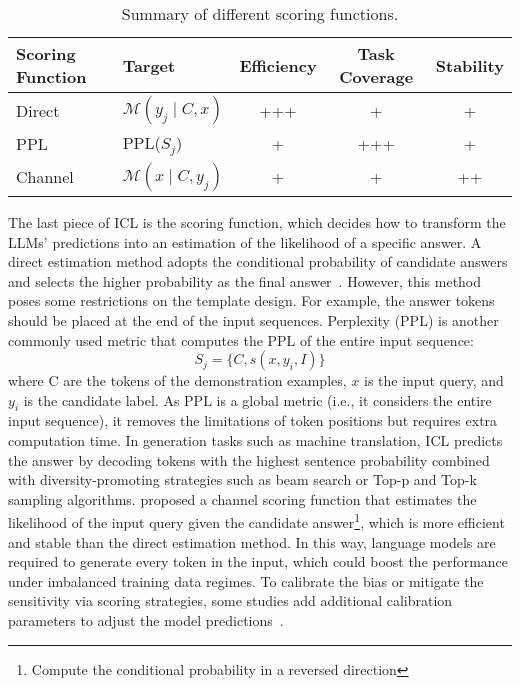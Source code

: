 \begin{table}[h!]
	\centering
	\small
	\begin{tabularx}{0.8\textwidth}{lXccc}
		\toprule
		\textbf{Scoring Function} & \textbf{Target}              & \textbf{Efficiency} & \textbf{Task Coverage} & \textbf{Stability} \\
		\midrule
		Direct                    & $\mathcal{M}(y_j \mid C, x)$ & +++                 & +                      & +                  \\
		PPL                       & PPL($S_j$)                   & +                   & +++                    & +                  \\
		Channel                   & $\mathcal{M}(x \mid C, y_j)$ & +                   & +                      & ++                 \\
		\bottomrule
	\end{tabularx}
	\caption{Summary of different scoring functions.}
	\label{tab:scoring-functions}
\end{table}

The last piece of ICL is the scoring function, which decides how to transform the LLMs' predictions into an estimation of the likelihood of a specific answer.
A direct estimation method adopts the conditional probability of candidate answers and selects the higher probability as the final answer~\cite{brown2020language}.
However, this method poses some restrictions on the template design. For example, the answer tokens should be placed at the end of the input sequences.
Perplexity (PPL) is another commonly used metric that computes the PPL of the entire input sequence:
\begin{equation}
	S_j = \{C,s(x,y_i,I)\}
	\label{eq:ppl}
\end{equation}
where C are the tokens of the demonstration examples, $x$ is the input query, and $y_i$ is the candidate label.
As PPL is a global metric (i.e., it considers the entire input sequence), it removes the limitations of token positions but requires extra computation time.
In generation tasks such as machine translation, ICL predicts the answer by decoding tokens with the highest sentence probability combined with diversity-promoting strategies such as beam search or Top-p and Top-k~\cite{holzman2020curious} sampling algorithms.
\textcite{min2022noisy} proposed a channel scoring function that estimates the likelihood of the input query given the candidate answer\footnote{Compute the conditional
	probability in a reversed direction}, which is more efficient and stable than the direct estimation method.
In this way, language models are required to generate every token in the input, which could boost the performance under imbalanced training data regimes.
To calibrate the bias or mitigate the sensitivity via scoring strategies, some studies add additional calibration parameters to adjust the model predictions~\cite{zhao2021calibrate}.

